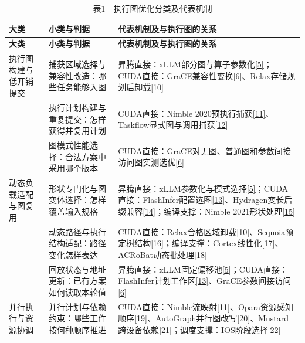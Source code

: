 \documentclass[UTF8,11pt,fontset=windows]{ctexart}
\begin{document}
\begingroup\small
\begin{longtable}[]{@{}>{\raggedright\arraybackslash}p{}>{\raggedright\arraybackslash}p{}>{\raggedright\arraybackslash}p{}@{}}
\caption{表1　执行图优化分类及代表机制}\tabularnewline
\toprule
\textbf{大类} & \textbf{小类与判据} & \textbf{代表机制及与执行图的关系} \\
\midrule
\endfirsthead
\toprule
\textbf{大类} & \textbf{小类与判据} & \textbf{代表机制及与执行图的关系} \\
\midrule
\endhead
执行图构建与低开销提交 & 捕获区域选择与兼容性改造：哪些任务能够入图 & 昇腾直接：xLLM部分图与算子参数化\protect\hyperlink{ref-5}{{[}5{]}}；CUDA直接：GraCE兼容性变换\protect\hyperlink{ref-6}{{[}6{]}}、Relax存储规划后卸载\protect\hyperlink{ref-10}{{[}10{]}} \\
& 执行计划构建与重复提交：怎样获得并复用计划 & CUDA直接：Nimble 2020预执行捕获\protect\hyperlink{ref-11}{{[}11{]}}、Taskflow显式图与调用捕获\protect\hyperlink{ref-12}{{[}12{]}} \\
& 图模式性能选择：合法方案中采用哪个版本 & CUDA直接：GraCE对无图、普通图和参数间接访问图实测选优\protect\hyperlink{ref-6}{{[}6{]}} \\
动态负载适配与图复用 & 形状专门化与图变体选择：怎样覆盖输入规格 & 昇腾直接：xLLM参数化与模式选择\protect\hyperlink{ref-5}{{[}5{]}}；CUDA直接：FlashInfer配置选图\protect\hyperlink{ref-13}{{[}13{]}}、Hydragen变长后缀兼容\protect\hyperlink{ref-14}{{[}14{]}}；编译支撑：Nimble 2021形状处理\protect\hyperlink{ref-15}{{[}15{]}} \\
& 动态路径与执行结构适配：路径变化怎样表达 & CUDA直接：Relax合格区域卸载\protect\hyperlink{ref-10}{{[}10{]}}、Sequoia预定树结构\protect\hyperlink{ref-16}{{[}16{]}}；编译支撑：Cortex线性化\protect\hyperlink{ref-17}{{[}17{]}}、ACRoBat动态批处理\protect\hyperlink{ref-18}{{[}18{]}} \\
& 回放状态与地址更新：已有方案如何读取本轮值 & 昇腾直接：xLLM固定偏移池\protect\hyperlink{ref-5}{{[}5{]}}；CUDA直接：FlashInfer计划工作区\protect\hyperlink{ref-13}{{[}13{]}}、GraCE参数间接访问\protect\hyperlink{ref-6}{{[}6{]}} \\
并行执行与资源协调 & 并行计划与依赖约束：哪些工作按何种顺序推进 & CUDA直接：Nimble流映射\protect\hyperlink{ref-11}{{[}11{]}}、Opara资源感知顺序\protect\hyperlink{ref-19}{{[}19{]}}、AutoGraph并行图改写\protect\hyperlink{ref-20}{{[}20{]}}、Mustard跨设备依赖\protect\hyperlink{ref-21}{{[}21{]}}；调度支撑：IOS阶段选择\protect\hyperlink{ref-22}{{[}22{]}} \\

\end{longtable}
\end{document}

